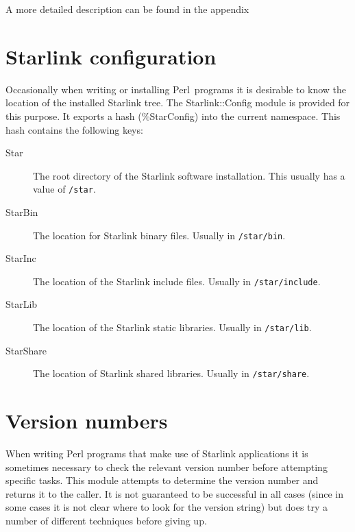 \documentclass[twoside,11pt]{article}
\newcommand{\perl}{\xref{\textsf{Perl}}{sun193}{}}
\newcommand{\xref}[3]{#1}
\renewcommand{\_}{\texttt{\symbol{95}}}
\begin{document}
A more detailed description can be found in the appendix

\section{Starlink configuration}

Occasionally when writing or installing \perl\ programs it is desirable to
know the location of the installed Starlink tree. The Starlink::Config module
is provided for this purpose. It exports a hash (\%StarConfig) into the
current namespace. This hash contains the following keys:

\begin{description}
\item[Star] \mbox{}

    The root directory of the Starlink software
    installation.  This usually has a value of \texttt{/star}.

\item[Star\_Bin] \mbox{}

    The location for Starlink binary files. Usually in
    \texttt{/star/bin}.

\item[Star\_Inc] \mbox{}

    The location of the Starlink include files. Usually in
    \texttt{/star/include}.

\item[Star\_Lib] \mbox{}

    The location of the Starlink static libraries. Usually
    in \texttt{/star/lib}.

\item[Star\_Share] \mbox{}
    The location of Starlink shared libraries. Usually in
    \texttt{/star/share}.

\end{description}

\section{Version numbers}


When writing Perl programs that make use of Starlink applications
it is sometimes necessary to check the relevant version number
before attempting specific tasks. This module attempts to determine
the version number and returns it to the caller. It is not guaranteed
to be successful in all cases (since in some cases it is not
clear where to look for the version string) but does try a number of different 
techniques before giving up.
\end{document}
